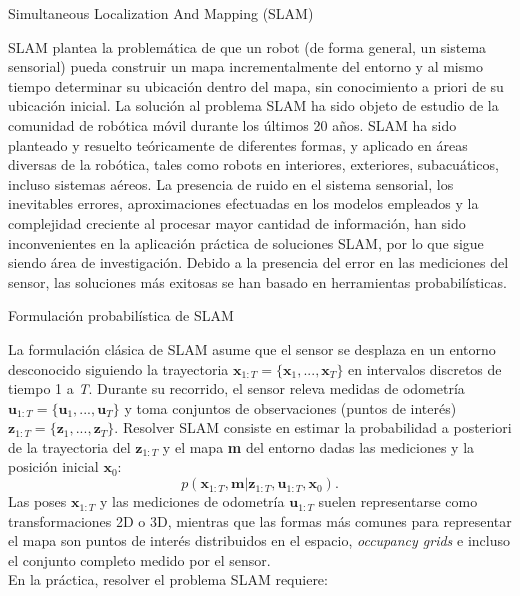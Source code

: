 \begin{subsection}{Simultaneous Localization And Mapping (SLAM) }

SLAM plantea la problemática de que un robot (de forma general, un sistema sensorial) pueda construir un mapa incrementalmente del entorno y al mismo tiempo determinar su ubicación dentro del mapa, sin conocimiento a priori de su ubicación inicial. La solución al problema SLAM ha sido objeto de estudio de la comunidad de robótica móvil durante los últimos 20 años. SLAM ha sido planteado y resuelto teóricamente de diferentes formas, y aplicado en áreas diversas de la robótica, tales como robots en interiores, exteriores, subacuáticos, incluso sistemas aéreos. La presencia de ruido en el sistema sensorial, los inevitables errores, aproximaciones efectuadas en los modelos empleados y la complejidad creciente al procesar mayor cantidad de información, han sido inconvenientes en la aplicación práctica de soluciones SLAM, por lo que sigue siendo área de investigación. Debido a la presencia del error en las mediciones del sensor, las soluciones más exitosas se han basado en herramientas probabilísticas.

\begin{subsection}{Formulación probabilística de SLAM}

La formulación clásica de SLAM asume que el sensor se desplaza en un entorno desconocido siguiendo la trayectoria $\textbf{x}_{1:T} = \{\textbf{x}_{1}, ..., \textbf{x}_{T}\}$ en intervalos discretos de tiempo 1 a \textsl{T}. Durante su recorrido, el sensor releva medidas de odometría $\textbf{u}_{1:T} = \{\textbf{u}_{1}, ..., \textbf{u}_{T}\}$ y toma conjuntos de observaciones (puntos de interés) $\textbf{z}_{1:T} = \{\textbf{z}_{1}, ..., \textbf{z}_{T}\}$. Resolver SLAM consiste en estimar la probabilidad a posteriori de la trayectoria del $\textbf{z}_{1:T}$ y el mapa \textbf{m} del entorno dadas las mediciones y la posición inicial $\textbf{x}_{0}$:
\begin{equation}
p(\textbf{x}_{1:T}, \textbf{m} | \textbf{z}_{1:T}, \textbf{u}_{1:T}, \textbf{x}_{0}).
\end{equation}
Las poses $\textbf{x}_{1:T}$ y las mediciones de odometría $\textbf{u}_{1:T}$ suelen representarse como transformaciones 2D o 3D, mientras que las formas más comunes para representar el mapa son puntos de interés distribuidos en el espacio, \textit{occupancy grids} e incluso el conjunto completo medido por el sensor. \\
En la práctica, resolver el problema SLAM requiere:
\begin{itemize}


\end{itemize}
\end{subsection}
\end{subsection}
